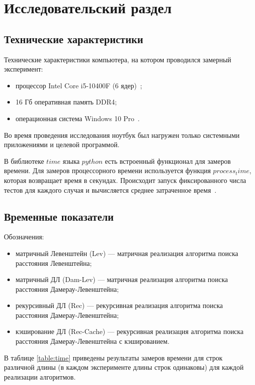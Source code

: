 \chapter{Исследовательский раздел}

\section{Технические характеристики}

Технические характеристики компьютера, на котором проводился замерный эксперимент:
\begin{itemize}
	\item процессор Intel Core i5-10400F (6 ядер)~\cite{intel};
	\item 16 Гб оперативная память DDR4;
	\item операционная система Windows 10 Pro~\cite{windows}.
\end{itemize}

Во время проведения исследования ноутбук был нагружен только системными приложениями и целевой программой. 

В библиотеке $time$ языка $python$ есть встроенный функционал для замеров времени.
Для замеров процессорного времени используется функция $process_time$, которая возвращает время в секундах.
Происходит запуск фиксированного числа тестов для каждого случая и вычисляется среднее затраченное время~\cite{python-time}.

\section{Временные показатели}

Обозначения:
\begin{itemize}
	\item матричный Левенштейн (Lev) --- матричная реализация алгоритма поиска расстояния Левенштейна;
	\item матричный ДЛ (Dam-Lev) --- матричная реализация алгоритма поиска расстояния Дамерау-Левенштейна;
	\item рекурсивный ДЛ (Rec) --- рекурсивная реализация алгоритма поиска расстояния Дамерау-Левенштейна;
	\item кэширование ДЛ (Rec-Cache) --- рекурсивная реализация алгоритма поиска расстояния Дамерау-Левенштейна с кэшированием.
\end{itemize}

В таблице \ref{table:time} приведены результаты замеров времени для строк различной длины (в каждом эксперименте длины строк одинаковы) для каждой реализации алгоритмов.


